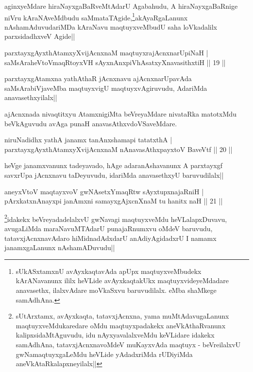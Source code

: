\begin{artha}
aginxyeMdare hiraNayxgaBaRveMtAdarU Agabahudu, A hiraNayxgaBaRnige niVru kAraNAveMdbudu 
saMmataTAgide,\footnote{sUkASxtamxnU avAyxkaqtavAda apUpx maqtuyxveMbudekx kArANavanunx  
ililx heVLide avAyxkaqtakUkx maqtuyxvideyeMdadare anavasethx, ilalxvAdare moVkaSxvu 
baruvudilalx. eMba shaMkege samAdhAna.}akAyaRgaLanunx nAshamAduvudariMDa kAraNavu 
maqtuyxveMbudU saha loVkadalilx parxsidadhxveV Agide||
\end{artha}

\begin{shl}
parxtayxgAyxthAtamxyXvijAcnxnaM maqtuyxrajAcnxnarUpiNaH |\\
saMsAraheVtoVmaqRtoyxVH sAyxnAnxpiVhAsatxyXnavasithxtiH \hfill || 19 ||
\end{shl}

\begin{artha}
parxtayxgAtamxna yathAthaR jAcnxnavu ajAcnxnarUpavAda saMsArabiVjaveMba maqtuyxvigU maqtuyxvAgiruvudu, AdariMda anavasethxyilalx||
\end{artha}

\begin{artha}
ajAcnxnada nivaqtitxyu AtamxnigiMta beVreyaMdare nivataRka matotxMdu beVkAguvudu avAga 
punaH anavasAthxvdoVSaveMdare.
\end{artha}


\begin{shl}
niruNadidhx yathA janamx tanAnxshamapi tatatxthA |\\
parxtayxgAyxthAtamxyXvijAcnxnaM nAnavasAthx\s payxtoV BaveVtf \hfill || 20 ||
\end{shl}

\begin{artha}
 heVge janamxvanunx tadeyavado, hAge adaranAshavanunx A parxtayxgf 
savxrUpa jAcnxnavu taDeyuvudu, idariMda anavasethxyU baruvudilalx||
\end{artha}

\begin{shl}
aneyxV\s toV maqtayxvoV gwNAsetxYmaqRtw sAyxtupxnajaRniH |\\
pArxkatxnAnayxpi janAmxni samayxgAjxcnXnaM tu hanitx naH \hfill || 21 ||
\end{shl}

\begin{artha}
\footnote{sUtArxtamx, avAyxkaqta, tatavxjAcnxna, yama muMtAdavugaLanunx 
maqtuyxveMdukaredare oMdu maqtuyxpadakekx aneVkAthaRvanunx kalipxsidaMtAguvudu, idu 
nAyxyavalalxveMdu keVLidare idakekx samAdhAna, tatavxjAcnxnavoMdeV muKayxvAda maqtuyx -   
beVreilalxvU gwNamaqtuyxgaLeMdu heVLide yAdadxriMda rUDiyiMda 
aneVkAtaRkalapxneyilalx||}idakekx beVreyadadelalxvU gwNavagi maqtuyxveMdu heVLalapxDuvavu, avugaLiMda maraNavuMTAdarU 
punajaRnumxvu oMdeV baruvudu, tatavxjAcnxnavAdaro hiMidnadAdxdarU anAdiyAgidadxrU I namamx 
janamxgaLanunx nAshamADuvudu||
\end{artha}

